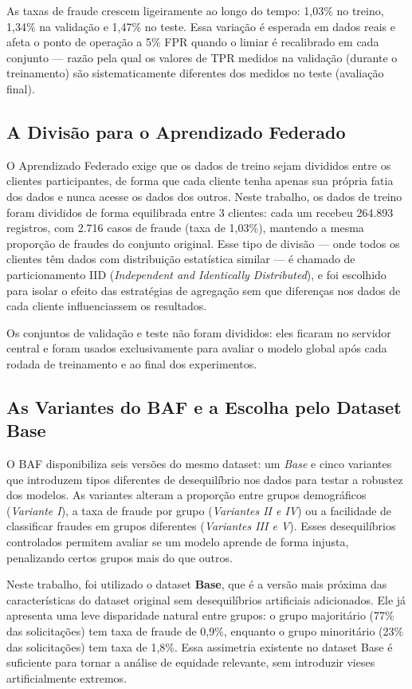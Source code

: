 As taxas de fraude crescem ligeiramente ao longo do tempo: 1,03\% no treino, 1,34\% na validação e 1,47\% no teste. Essa variação é esperada em dados reais e afeta o ponto de operação a 5\% FPR quando o limiar é recalibrado em cada conjunto --- razão pela qual os valores de TPR medidos na validação (durante o treinamento) são sistematicamente diferentes dos medidos no teste (avaliação final).

\subsection{A Divisão para o Aprendizado Federado}

O Aprendizado Federado exige que os dados de treino sejam divididos entre os clientes participantes, de forma que cada cliente tenha apenas sua própria fatia dos dados e nunca acesse os dados dos outros. Neste trabalho, os dados de treino foram divididos de forma equilibrada entre 3 clientes: cada um recebeu 264.893 registros, com 2.716 casos de fraude (taxa de 1,03\%), mantendo a mesma proporção de fraudes do conjunto original. Esse tipo de divisão --- onde todos os clientes têm dados com distribuição estatística similar --- é chamado de particionamento IID (\textit{Independent and Identically Distributed}), e foi escolhido para isolar o efeito das estratégias de agregação sem que diferenças nos dados de cada cliente influenciassem os resultados.

Os conjuntos de validação e teste não foram divididos: eles ficaram no servidor central e foram usados exclusivamente para avaliar o modelo global após cada rodada de treinamento e ao final dos experimentos.

\subsection{As Variantes do BAF e a Escolha pelo Dataset Base}

O BAF disponibiliza seis versões do mesmo dataset: um \textit{Base} e cinco variantes que introduzem tipos diferentes de desequilíbrio nos dados para testar a robustez dos modelos. As variantes alteram a proporção entre grupos demográficos (\textit{Variante I}), a taxa de fraude por grupo (\textit{Variantes II e IV}) ou a facilidade de classificar fraudes em grupos diferentes (\textit{Variantes III e V}). Esses desequilíbrios controlados permitem avaliar se um modelo aprende de forma injusta, penalizando certos grupos mais do que outros.

Neste trabalho, foi utilizado o dataset \textbf{Base}, que é a versão mais próxima das características do dataset original sem desequilíbrios artificiais adicionados. Ele já apresenta uma leve disparidade natural entre grupos: o grupo majoritário (77\% das solicitações) tem taxa de fraude de 0,9\%, enquanto o grupo minoritário (23\% das solicitações) tem taxa de 1,8\%. Essa assimetria existente no dataset Base é suficiente para tornar a análise de equidade relevante, sem introduzir vieses artificialmente extremos.
